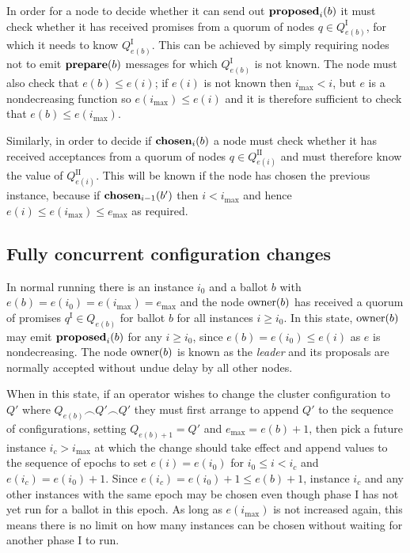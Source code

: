 \documentclass[journal]{IEEEtran}
\begin{document}
In order for a node to decide whether it can send out $\mathbf{proposed}_{i}(b)$ it must
check whether it has received promises from a quorum of nodes $q \in
Q^\textrm{I}_{e(b)}$, for which it needs to know $Q^\textrm{I}_{e(b)}$. This
can be achieved by simply requiring nodes not to emit $\mathbf{prepare}(b)$ messages for
which $Q^\textrm{I}_{e(b)}$ is not known. The node must also check that $e(b)
\le e(i)$; if $e(i)$ is not known then $i_\mathrm{max} < i$, but $e$ is a
nondecreasing function so $e(i_\mathrm{max}) \le e(i)$ and it is therefore
sufficient to check that $e(b) \le e(i_\mathrm{max})$.

Similarly, in order to decide if $\mathbf{chosen}_{i}(b)$ a node must check whether it
has received acceptances from a quorum of nodes $q \in Q^\textrm{II}_{e(i)}$
and must therefore know the value of $Q^\textrm{II}_{e(i)}$. This will be known
if the node has chosen the previous instance, because if $\mathbf{chosen}_{i-1}(b')$
then $i < i_\mathrm{max}$ and hence ${e(i) \le e(i_\mathrm{max}) \le
e_\mathrm{max}}$ as required.

\subsection{Fully concurrent configuration changes}

In normal running there is an instance $i_0$ and a ballot $b$ with ${e(b) =
e(i_0) = e(i_\mathrm{max}) = e_\mathrm{max}}$ and the node $\mathrm{owner}(b)$ has
received a quorum of promises $q^\textrm{I} \in Q_{e(b)}$ for ballot $b$ for
all instances $i \ge i_0$. In this state, $\mathrm{owner}(b)$ may emit $\mathbf{proposed}_{i}(b)$
for any $i \ge i_0$, since $e(b) = e(i_0) \le e(i)$ as $e$ is nondecreasing.
The node $\mathrm{owner}(b)$ is known as the \textit{leader} and its proposals are
normally accepted without undue delay by all other nodes.

When in this state, if an operator wishes to change the cluster configuration
to $Q'$ where $Q_{e(b)} \frown Q' \frown Q'$ they must first arrange to append
$Q'$ to the sequence of configurations, setting $Q_{e(b)+1} = Q'$ and
$e_\mathrm{max} = e(b) + 1$, then pick a future instance $i_c > i_\mathrm{max}$
at which the change should take effect and append values to the sequence of
epochs to set $e(i) = e(i_0)$ for $i_0 \le i < i_c$ and $e(i_c) = e(i_0) + 1$.
Since $e(i_c) = e(i_0) + 1 \le e(b) + 1$, instance $i_c$ and any other
instances with the same epoch may be chosen even though phase I has not yet run
for a ballot in this epoch. As long as $e(i_\mathrm{max})$ is not increased
again, this means there is no limit on how many instances can be chosen without
waiting for another phase I to run.
\end{document}
